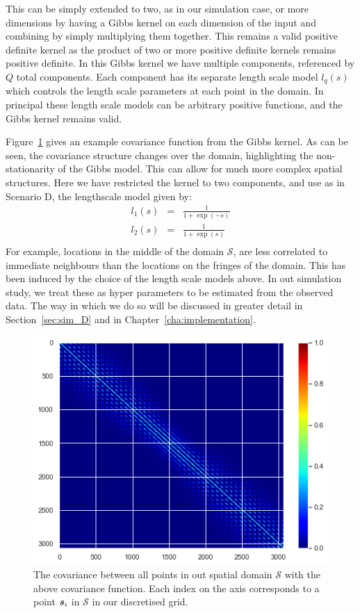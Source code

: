 This can be simply extended to two, as in our simulation case, or more dimensions by having a Gibbs kernel on each dimension of the input and combining by simply multiplying them together.
This remains a valid positive definite kernel as the product of two or more positive definite kernels remains positive definite. 
In this Gibbs kernel we have multiple components, referenced by $Q$ total components.
Each component has its separate length scale model $l_q(s)$ which controls the length scale parameters at each point in the domain.
In principal these length scale models can be arbitrary positive functions, and the Gibbs kernel remains valid.

Figure~\ref{fig:ex_gibbs} gives an example covariance function from the Gibbs kernel.
As can be seen, the covariance structure changes over the domain, highlighting the non-stationarity of the Gibbs model.
This can allow for much more complex spatial structures.
Here we have restricted the kernel to two components, and use as in Scenario D, the lengthscale model given by:
\begin{eqnarray}
	l_1(s) &=& \frac{1}{1 + \exp(-s)} \nonumber \\
	l_2(s) &=& \frac{1}{1 +  \exp(s)} \nonumber \\
\end{eqnarray}
For example, locations in the middle of the domain $\mathcal{S}$, are less correlated to immediate neighbours than the locations on the fringes of the domain.
This has been induced by the choice of the length scale models above.
In out simulation study, we treat these as hyper parameters to be estimated from the observed data.
The way in which we do so will be discussed in greater detail in Section~\ref{sec:sim_D} and in Chapter~\ref{cha:implementation}.

\begin{figure}
	\centering
	\includegraphics[width=\textwidth]{ex_gibbs}
	\caption{The covariance between all points in out spatial domain $\mathcal{S}$ with the above covariance function. Each index on the axis corresponds to a point $\bm{{s}}_i$ in $\mathcal{S}$ in our discretised grid.}
	\label{fig:ex_gibbs}
\end{figure}

